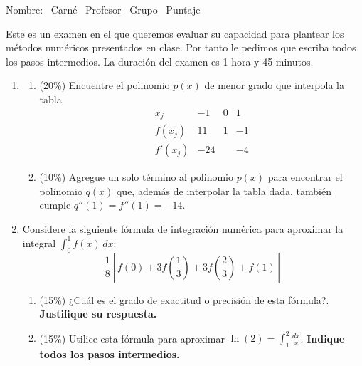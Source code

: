 \documentclass[11pt]{article}
\begin{document}
\examheader

\vspace{6pt}
\noindent Nombre: \dotfill\ Carné \dotfill\ Profesor \dotfill\ Grupo \dotfill\ Puntaje \dotfill

\vspace{8pt}
\noindent Este es un examen en el que queremos evaluar su capacidad para plantear los métodos numéricos presentados en clase. Por tanto le pedimos que escriba todos los pasos intermedios. La duración del examen es 1 hora y 45 minutos.

\vspace{10pt}
\begin{enumerate}
\item{}
\begin{enumerate}
\item{} (20\%) Encuentre el polinomio $p(x)$ de menor grado que interpola la tabla
\[
\begin{array}{c|ccc}
x_j & -1 & 0 & 1\\ \hline
f(x_j) & 11 & 1 & -1\\
f'(x_j) & -24 & & -4
\end{array}
\]

\vspace{4cm}

\item{} (10\%) Agregue un solo término al polinomio $p(x)$ para encontrar el polinomio $q(x)$ que, además de interpolar la tabla dada, también cumple $q''(1)=f''(1)=-14$.

\vspace{3cm}
\end{enumerate}

\item{} Considere la siguiente fórmula de integración numérica para aproximar la integral $\int_0^1 f(x)\,dx$:
\[
\frac{1}{8}\left[f(0)+3f\left(\frac{1}{3}\right)+3f\left(\frac{2}{3}\right)+f(1)\right]
\]
\begin{enumerate}
\item{} (15\%) ¿Cuál es el grado de exactitud o precisión de esta fórmula?. \textbf{Justifique su respuesta.}

\vspace{4cm}

\item{} (15\%) Utilice esta fórmula para aproximar $\ln(2)=\int_1^2\frac{dx}{x}$. \textbf{Indique todos los pasos intermedios.}

\vspace{4cm}
\end{enumerate}


\end{enumerate}
\end{document}
